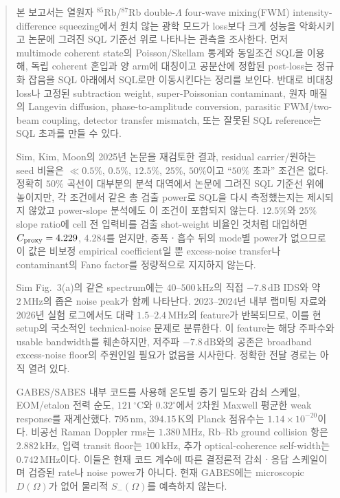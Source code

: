 \documentclass[11pt,a4paper]{article}
\newcommand{\MHz}{\,\mathrm{MHz}}
\newcommand{\kHz}{\,\mathrm{kHz}}
\newcommand{\dB}{\,\mathrm{dB}}
\newcommand{\degC}{\,^{\circ}\mathrm C}
\newcommand{\enquote}[1]{“#1”}
\begin{document}
\begin{abstract}
본 보고서는 열원자 $^{85}$Rb/$^{87}$Rb double-$\Lambda$ four-wave mixing(FWM)
intensity-difference squeezing에서 원치 않는 광학 모드가 loss보다 크게 성능을
악화시키고 논문에 그려진 SQL 기준선 위로 나타나는 관측을 조사한다. 먼저 multimode
coherent state의 Poisson/Skellam 통계와 동일조건 SQL을 이용해, 독립 coherent 혼입과
양 arm에 대칭이고 공분산에 정합된 post-loss는 정규화 잡음을 SQL 아래에서 SQL로만
이동시킨다는 정리를 보인다. 반대로 비대칭 loss나 고정된 subtraction weight,
super-Poissonian contaminant, 원자 매질의 Langevin diffusion, phase-to-amplitude
conversion, parasitic FWM/two-beam coupling, detector transfer mismatch, 또는 잘못된
SQL reference는 SQL 초과를 만들 수 있다.

Sim, Kim, Moon의 2025년 논문을 재검토한 결과, residual carrier/원하는 seed 비율은
$\ll0.5\%$, $0.5\%$, $12.5\%$, $25\%$, $50\%$이고 \enquote{$50\%$ 초과} 조건은 없다.
정확히 $50\%$ 곡선이 대부분의 분석 대역에서 논문에 그려진 SQL 기준선 위에 놓이지만,
각 조건에서 같은 총 검출 power로 SQL을 다시 측정했는지는 제시되지 않았고 power-slope
분석에도 이 조건이 포함되지 않는다. $12.5\%$와 $25\%$ slope ratio에 cell 전 입력비를
검출 shot-weight 비율인 것처럼 대입하면 $C_{\rm proxy}=4.229$, $4.284$를 얻지만,
증폭ㆍ흡수 뒤의 mode별 power가 없으므로 이 값은 비보정 empirical coefficient일 뿐
excess-noise transfer나 contaminant의 Fano factor를 정량적으로 지지하지 않는다.

Sim Fig.~3(a)의 같은 spectrum에는 $40$--$500\kHz$의 직접 $-7.8\dB$ IDS와
약 $2\MHz$의 좁은 noise peak가 함께 나타난다\cite{Sim2025}. 2023--2024년 내부
랩미팅 자료와 2026년 실험 로그에서도 대략 $1.5$--$2.4\MHz$의 feature가 반복되므로,
이를 현 setup의 국소적인 technical-noise 문제로 분류한다. 이 feature는 해당 주파수와
usable bandwidth를 훼손하지만, 저주파 $-7.8\dB$와의 공존은 broadband excess-noise
floor의 주원인일 필요가 없음을 시사한다. 정확한 전달 경로는 아직 열려 있다.

GABES/SABES 내부 코드를 사용해 온도별 증기 밀도와 감쇠 스케일, EOM/etalon 전력
순도, $121\degC$와 $0.32^\circ$에서 2차원 Maxwell 평균한 weak response를 재계산했다.
$795\,\mathrm{nm}$, $394.15\,\mathrm K$의 Planck 점유수는
$1.14\times10^{-20}$이다. 비공선 Raman Doppler rms는 $1.380\MHz$, Rb--Rb ground
collision 항은 $2.882\kHz$, 입력 transit floor는 $100\kHz$, 추가 optical-coherence
self-width는 $0.742\MHz$이다. 이들은 현재 코드 계수에 따른 결정론적 감쇠ㆍ응답
스케일이며 검증된 rate나 noise power가 아니다. 현재 GABES에는 microscopic
$D(\Omega)$가 없어 물리적 $S_-(\Omega)$를
예측하지 않는다.
\end{abstract}
\tableofcontents
\clearpage
\end{document}
